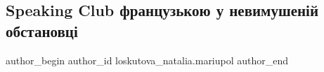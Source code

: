  
 
 
 
 

\subsection{Speaking Club французькою у невимушеній обстановці}
\label{sec:10_10_2021.fb.loskutova_natalia.mariupol.1.speaking_club_frants}

\ifcmt
 author_begin
   author_id loskutova_natalia.mariupol
 author_end
\fi
